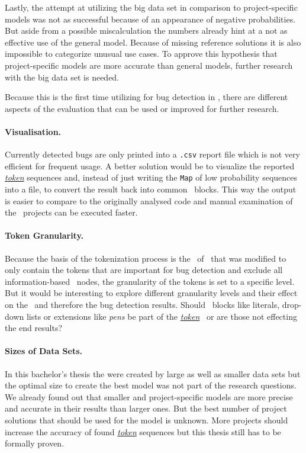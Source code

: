 Lastly, the attempt at utilizing the big data set in comparison to project-specific models was not as successful because of an appearance of negative probabilities. But aside from a possible miscalculation the numbers already hint at a not as effective use of the general model. Because of missing reference solutions it is also impossible to categorize unusual use cases. To approve this hypothesis that project-specific models are more accurate than general models, further research with the big data set is needed.

Because this is the first time utilizing  for bug detection in \scratch{}, there are different aspects of the evaluation that can be used or improved for further research. 


\paragraph{Visualisation.}
Currently detected bugs are only printed into a \texttt{.csv} report file which is not very efficient for frequent usage. A better solution would be to visualize the reported \hyperref[def:token]{\textit{token}} sequences and, instead of just writing the \texttt{Map} of low probability sequences into a file, to convert the result back into common \scratch\ blocks. This way the output is easier to compare to the originally analysed code and manual examination of the \scratch\ projects can be executed faster. 

\paragraph{Token Granularity.}
Because the basis of the tokenization process is the \AST\ of \litterbox\ that was modified to only contain the tokens that are important for bug detection and exclude all information-based \AST\ nodes, the granularity of the tokens is set to a specific level. But it would be interesting to explore different granularity levels and their effect on the \ngram\ and therefore the bug detection results. Should \scratch\ blocks like literals, drop-down lists or extensions like \textit{pens} be part of the \hyperref[def:token]{\textit{token}} \AST\ or are those not effecting the end results? 

\paragraph{Sizes of Data Sets.}
In this bachelor's thesis the  were created by large as well as smaller data sets but the optimal size to create the best model was not part of the research questions. We already found out that smaller and project-specific models are more precise and accurate in their results than larger ones. But the best number of project solutions that should be used for the model is unknown. More projects should increase the accuracy of found \hyperref[def:token]{\textit{token}} sequences but this thesis still has to be formally proven.  

